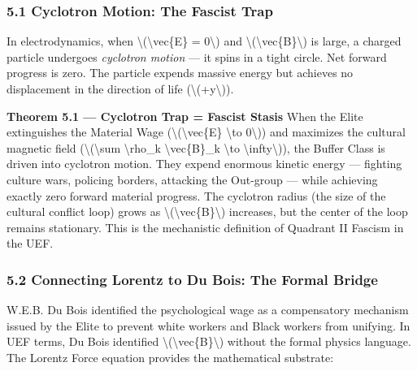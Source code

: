 {\subsubsection{5.1 Cyclotron Motion: The Fascist
Trap}\label{cyclotron-motion-the-fascist-trap}

In electrodynamics, when \textbackslash(\textbackslash vec\{E\} =
0\textbackslash) and
\textbackslash(\textbackslash vec\{B\}\textbackslash) is large, a
charged particle undergoes \emph{cyclotron motion} --- it spins in a
tight circle. Net forward progress is zero. The particle expends massive
energy but achieves no displacement in the direction of life
(\textbackslash(+y\textbackslash)).

\textbf{Theorem 5.1 --- Cyclotron Trap = Fascist Stasis} When the Elite
extinguishes the Material Wage (\textbackslash(\textbackslash vec\{E\}
\textbackslash to 0\textbackslash)) and maximizes the cultural magnetic
field (\textbackslash(\textbackslash sum \textbackslash rho\_k
\textbackslash vec\{B\}\_k \textbackslash to
\textbackslash infty\textbackslash)), the Buffer Class is driven into
cyclotron motion. They expend enormous kinetic energy --- fighting
culture wars, policing borders, attacking the Out-group --- while
achieving exactly zero forward material progress. The cyclotron radius
(the size of the cultural conflict loop) grows as
\textbackslash(\textbackslash vec\{B\}\textbackslash) increases, but the
center of the loop remains stationary. This is the mechanistic
definition of Quadrant II Fascism in the UEF.

\subsubsection{5.2 Connecting Lorentz to Du Bois: The Formal
Bridge}\label{connecting-lorentz-to-du-bois-the-formal-bridge}

W.E.B. Du Bois identified the psychological wage as a compensatory
mechanism issued by the Elite to prevent white workers and Black workers
from unifying. In UEF terms, Du Bois identified
\textbackslash(\textbackslash vec\{B\}\textbackslash) without the formal
physics language. The Lorentz Force equation provides the mathematical
substrate:

}
